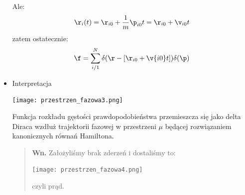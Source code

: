 \begin{itemize}
Ale:
\begin{equation}\r_i(t)=\r_{i0}+\frac{1}{m}\p_{i0}t=\r_{i0}+\v_{i0}t\end{equation}
zatem ostatecznie:
\begin{equation}\f=\sum_{i/1}^N\delta(\r-[\r_{i0}+\v{i0}t])\delta(\p) \end{equation}
\item{Interpretacja}\\
\begin{center}
\texttt{[image: przestrzen\_fazowa3.png]}
\end{center}
Funkcja rozkładu gęstości prawdopodobieństwa przemieszcza się jako delta Diraca wzdłuż trajektorii fazowej w przestrzeni $\mu$ będącej rozwiązaniem kanonicznych równań Hamiltona.\\
\begin{verse}\textbf{Wn. }Założyliśmy brak zderzeń i dostaliśmy to:
\begin{center}\texttt{[image: przestrzen\_fazowa4.png]}\end{center}
czyli prąd. \end{verse}
\end{itemize}

